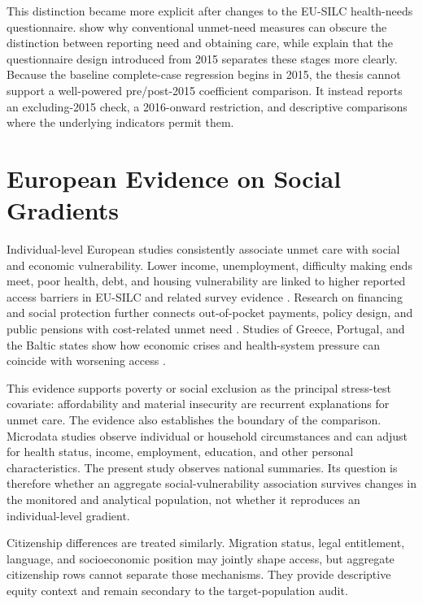 This distinction became more explicit after changes to the EU-SILC health-needs questionnaire. \citet{A4_ramos_2019} show why conventional unmet-need measures can obscure the distinction between reporting need and obtaining care, while \citet{ingleby_guidi_2025_unmet_needs_methodology} explain that the questionnaire design introduced from 2015 separates these stages more clearly. Because the baseline complete-case regression begins in 2015, the thesis cannot support a well-powered pre/post-2015 coefficient comparison. It instead reports an excluding-2015 check, a 2016-onward restriction, and descriptive comparisons where the underlying indicators permit them.

\section{European Evidence on Social Gradients}

Individual-level European studies consistently associate unmet care with social and economic vulnerability. Lower income, unemployment, difficulty making ends meet, poor health, debt, and housing vulnerability are linked to higher reported access barriers in EU-SILC and related survey evidence \citep{A1_chaupain_guillot_2015,A2_madureira_lima_2018,A3_israel_2016,A5_cylus_papanicolas_2015}. Research on financing and social protection further connects out-of-pocket payments, policy design, and public pensions with cost-related unmet need \citep{B2_kaminska_wulfgramm_2019,C4_reeves_mckee_mackenbach_2017}. Studies of Greece, Portugal, and the Baltic states show how economic crises and health-system pressure can coincide with worsening access \citep{zavras_zavras_kyriopoulos_2016,legido_quigley_karanikolos_2016,karanikolos_gordeev_mackenbach_2016}.

This evidence supports poverty or social exclusion as the principal stress-test covariate: affordability and material insecurity are recurrent explanations for unmet care. The evidence also establishes the boundary of the comparison. Microdata studies observe individual or household circumstances and can adjust for health status, income, employment, education, and other personal characteristics. The present study observes national summaries. Its question is therefore whether an aggregate social-vulnerability association survives changes in the monitored and analytical population, not whether it reproduces an individual-level gradient.

Citizenship differences are treated similarly. Migration status, legal entitlement, language, and socioeconomic position may jointly shape access, but aggregate citizenship rows cannot separate those mechanisms. They provide descriptive equity context and remain secondary to the target-population audit.

